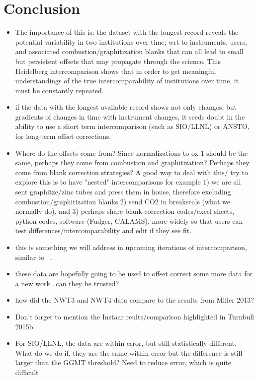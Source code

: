 \newpage
\section{Conclusion}
\begin{itemize}
	\item The importance of this is: the dataset with the longest record reveals the potential variability in two institutions over time; wrt to instruments, users, and associated combustion/graphitization blanks that can all lead to small but persistent offsets that may propagate through the science. This Heidelberg intercomparison shows that in order to get meaningful understandings of the true intercomparability of institutions over time, it must be constantly repeated. 
	\item if the data with the longest available record shows not only changes, but gradients of changes in time with instrument changes, it seeds doubt in the ability to use a short term intercomparison (such as SIO/LLNL) or ANSTO, for long-term offset corrections. 
	\item Where do the offsets come from? Since normalizations to ox-1 should be the same, perhaps they come from combustion and graphitization? Perhaps they come from blank correction strategies? A good way to deal with this/ try to explore this is to have "nested" intercomparisons for example 1) we are all sent graphitze/zinc tubes and press them in house, therefore excluding combustion/graphitization blanks 2) send CO2 in breakseals (what we normally do), and 3) perhaps share blank-correction codes/excel sheets, python codes, software (Fudger, CALAMS), more widely so that users can test differences/intercomparability and edit if they see fit. 
	\item this is something we will address in upcoming iterations of intercomparison, similar to ~\cite{miller2013}. 
    \item these data are hopefully going to be used to offset correct some more data for a new work...can they be trusted? 
    \item how did the NWT3 and NWT4 data compare to the results from Miller 2013? 
    \item Don't forget to mention the Instaar reults/comparison highlighted in Turnbull 2015b.
    \item For SIO/LLNL, the data are within error, but still statistically different. What do we do if, they are the same within error but the difference is still larger than the GGMT threshold? Need to reduce error, which is quite difficult
    
\end{itemize}
    